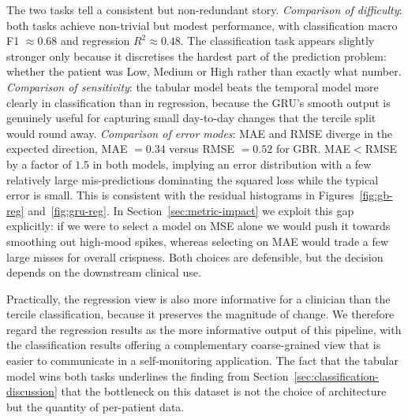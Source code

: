 The two tasks tell a consistent but non-redundant story. \textit{Comparison of difficulty}: both tasks achieve non-trivial but modest performance, with classification macro F1 $\approx 0.68$ and regression $R^2 \approx 0.48$. The classification task appears slightly stronger only because it discretises the hardest part of the prediction problem: whether the patient was Low, Medium or High rather than exactly what number. \textit{Comparison of sensitivity}: the tabular model beats the temporal model more clearly in classification than in regression, because the GRU's smooth output is genuinely useful for capturing small day-to-day changes that the tercile split would round away. \textit{Comparison of error modes}: MAE and RMSE diverge in the expected direction, MAE $= 0.34$ versus RMSE $= 0.52$ for GBR. MAE$<$RMSE by a factor of $1.5$ in both models, implying an error distribution with a few relatively large mis-predictions dominating the squared loss while the typical error is small. This is consistent with the residual histograms in Figures~\ref{fig:gb-reg} and~\ref{fig:gru-reg}. In Section~\ref{sec:metric-impact} we exploit this gap explicitly: if we were to select a model on MSE alone we would push it towards smoothing out high-mood spikes, whereas selecting on MAE would trade a few large misses for overall crispness. Both choices are defensible, but the decision depends on the downstream clinical use.

Practically, the regression view is also more informative for a clinician than the tercile classification, because it preserves the magnitude of change. We therefore regard the regression results as the more informative output of this pipeline, with the classification results offering a complementary coarse-grained view that is easier to communicate in a self-monitoring application. The fact that the tabular model wins both tasks underlines the finding from Section~\ref{sec:classification-discussion} that the bottleneck on this dataset is not the choice of architecture but the quantity of per-patient data.
